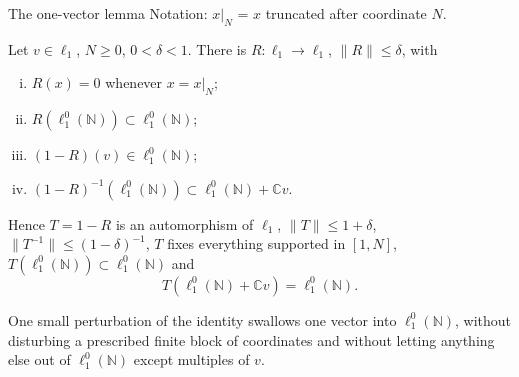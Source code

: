 \documentclass[10pt,aspectratio=169]{beamer}
\newcommand{\lo}[1]{\ell_1^0(#1)}
\newcommand{\NN}{\mathbb N}
\newcommand{\CC}{\mathbb C}
\begin{document}
\begin{frame}{The one-vector lemma}
  Notation: $x|_N$ = $x$ truncated after coordinate $N$.
  \begin{lemma}
    Let $v\in\ell_1$, $N\ge0$, $0<\delta<1$. There is $R\colon\ell_1\to\ell_1$,
    $\|R\|\le\delta$, with
    \begin{enumerate}[(i)]
      \item $R(x)=0$ whenever $x=x|_N$;
      \item $R(\lo\NN)\subset\lo\NN$;
      \item $(1-R)(v)\in\lo\NN$;
      \item ${(1-R)}^{-1}(\lo\NN)\subset\lo\NN+\CC v$.
    \end{enumerate}
    Hence $T=1-R$ is an automorphism of $\ell_1$, $\|T\|\le1+\delta$,
    $\|T^{-1}\|\le{(1-\delta)}^{-1}$, $T$ fixes everything supported in $[1,N]$,
    $T(\lo\NN)\subset\lo\NN$ and
    \[
      T(\lo\NN+\CC v)=\lo\NN .
    \]
  \end{lemma}
  One small perturbation of the identity swallows one vector into $\lo\NN$,
  without disturbing a prescribed finite block of coordinates and without
  letting anything else out of $\lo\NN$ except multiples of $v$.
\end{frame}
\end{document}
